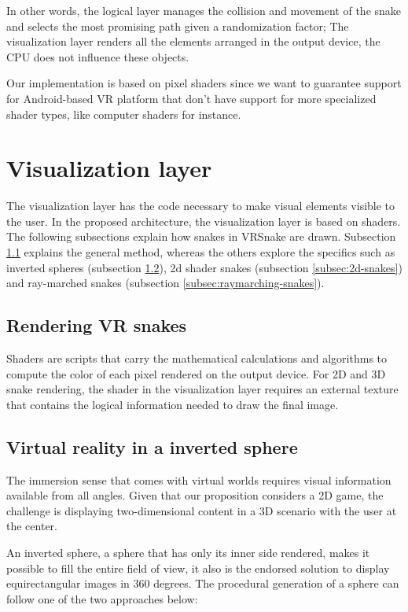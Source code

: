 \documentclass[runningheads]{llncs}
\begin{document}
In other words, the logical layer manages the collision and movement of the snake and selects the most promising path given a randomization factor; The visualization layer renders all the elements arranged in the output device, the CPU does not influence these objects.

Our implementation is based on pixel shaders since we want to guarantee support for Android-based VR platform that don't have support for more specialized shader types, like computer shaders for instance.

\section{Visualization layer}
\label{sec:visualization-layer}
The visualization layer has the code necessary to make visual elements visible to the user. In the proposed architecture, the visualization layer is based on shaders. The following subsections explain how snakes in VRSnake are drawn. Subsection \ref{subsec:rendering-snakes} explains the general method, whereas the others explore the specifics such as inverted spheres (subsection \ref{subsec:inverted-sphere}), 2d shader snakes (subsection \ref{subsec:2d-snakes}) and ray-marched snakes (subsection \ref{subsec:raymarching-snakes}).

\subsection{Rendering VR snakes}
\label{subsec:rendering-snakes}
Shaders are scripts that carry the mathematical calculations and algorithms to compute the color of each pixel rendered on the output device. For 2D and 3D snake rendering, the shader in the visualization layer requires an external texture that contains the logical information needed to draw the final image.

\subsection{Virtual reality in a inverted sphere}
\label{subsec:inverted-sphere}
The immersion sense that comes with virtual worlds requires visual information available from all angles. Given that our proposition considers a 2D game, the challenge is displaying two-dimensional content in a 3D scenario with the user at the center.

An inverted sphere, a sphere that has only its inner side rendered, makes it possible to fill the entire field of view, it also is the endorsed solution to display equirectangular images in 360 degrees. The procedural generation of a sphere can follow one of the two approaches below:
\end{document}

